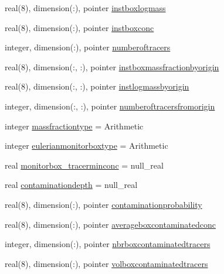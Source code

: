 \begin{DoxyCompactItemize}
real(8), dimension(\+:), pointer \mbox{\hyperlink{structmodulelagrangian_1_1t__monitorization_a49f1f594247a32cd3f45322b9955d5f5}{instboxlogmass}}
\item 
real(8), dimension(\+:), pointer \mbox{\hyperlink{structmodulelagrangian_1_1t__monitorization_a411b75ec3bc0946d3fede2f6816d9afc}{instboxconc}}
\item 
integer, dimension(\+:), pointer \mbox{\hyperlink{structmodulelagrangian_1_1t__monitorization_a0b5dba1fa0d3b6b09aac98a832354a2c}{numberoftracers}}
\item 
real(8), dimension(\+:, \+:), pointer \mbox{\hyperlink{structmodulelagrangian_1_1t__monitorization_ada7cdb9c26b40abf64878f7922197c5f}{instboxmassfractionbyorigin}}
\item 
real(8), dimension(\+:, \+:), pointer \mbox{\hyperlink{structmodulelagrangian_1_1t__monitorization_a6c7877301f86a70c7cdcf48bd3df6956}{instlogmassbyorigin}}
\item 
integer, dimension(\+:, \+:), pointer \mbox{\hyperlink{structmodulelagrangian_1_1t__monitorization_abcca94770c3c299ba10bebef5c3261ac}{numberoftracersfromorigin}}
\item 
integer \mbox{\hyperlink{structmodulelagrangian_1_1t__monitorization_af3552d77a665a5f994cabd2617d697b0}{massfractiontype}} = Arithmetic
\item 
integer \mbox{\hyperlink{structmodulelagrangian_1_1t__monitorization_ae4747f894838cdfdcc257580cb295310}{eulerianmonitorboxtype}} = Arithmetic
\item 
real \mbox{\hyperlink{structmodulelagrangian_1_1t__monitorization_a218234d90409fc78387d17afe92ca4b1}{monitorbox\+\_\+tracerminconc}} = null\+\_\+real
\item 
real \mbox{\hyperlink{structmodulelagrangian_1_1t__monitorization_a2dcc3902592d240bc89bcbf32712b756}{contaminationdepth}} = null\+\_\+real
\item 
real(8), dimension(\+:), pointer \mbox{\hyperlink{structmodulelagrangian_1_1t__monitorization_ad13c58a6865e9a900cc606253c59fb95}{contaminationprobability}}
\item 
real(8), dimension(\+:), pointer \mbox{\hyperlink{structmodulelagrangian_1_1t__monitorization_a3ee9ed4de6bd79e7333322e8be523984}{averageboxcontaminatedconc}}
\item 
integer, dimension(\+:), pointer \mbox{\hyperlink{structmodulelagrangian_1_1t__monitorization_af505b4adf981ba8a602f3ef35a198894}{nbrboxcontaminatedtracers}}
\item 
real(8), dimension(\+:), pointer \mbox{\hyperlink{structmodulelagrangian_1_1t__monitorization_a84f3232db4f8eb3fe334d2570c6a3b52}{volboxcontaminatedtracers}}
\end{DoxyCompactItemize}


